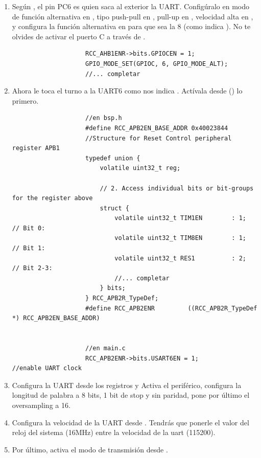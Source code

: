 \documentclass[../main.tex]{subfiles}
\begin{document}
        \begin{enumerate}
            \item Según \DSMAN[Table 10], el pin PC6 es quien saca al exterior la UART. Configúralo en modo de función alternativa en , tipo push-pull en , pull-up en , velocidad alta en , y configura la función alternativa en  para que sea la 8 (como indica \DSMAN[Table 12]). No te olvides de activar el puerto C a través de .
            
                \begin{lstlisting}
                    RCC_AHB1ENR->bits.GPIOCEN = 1;
                    GPIO_MODE_SET(GPIOC, 6, GPIO_MODE_ALT);
                    //... completar
                \end{lstlisting}

            \item Ahora le toca el turno a la UART6 como nos indica \BRDMAN[5.13]. Actívala desde  (\REFMAN[5.3.14]) lo primero.
            
                \begin{lstlisting}
                    //en bsp.h
                    #define RCC_APB2EN_BASE_ADDR 0x40023844
                    //Structure for Reset Control peripheral register APB1
                    typedef union {
                        volatile uint32_t reg;

                        // 2. Access individual bits or bit-groups for the register above
                        struct {
                            volatile uint32_t TIM1EN	   	: 1;  // Bit 0:
                            volatile uint32_t TIM8EN	   	: 1;  // Bit 1:
                            volatile uint32_t RES1		   	: 2;  // Bit 2-3:
                            //... completar
                        } bits;
                    } RCC_APB2R_TypeDef;
                    #define RCC_APB2ENR			((RCC_APB2R_TypeDef *) RCC_APB2EN_BASE_ADDR)

                    
                    //en main.c
                    RCC_APB2ENR->bits.USART6EN = 1; 		//enable UART clock
                \end{lstlisting}

            \item Configura la UART desde los registros  y  Activa el periférico, configura la longitud de palabra a 8 bits, 1 bit de stop y sin paridad, pone por último el oversampling a 16.
            \item Configura la velocidad de la UART desde . Tendrás que ponerle el valor del reloj del sistema (16MHz) entre la velocidad de la uart (115200).
            \item Por último, activa el modo de transmisión desde .
            

\end{enumerate}
\end{document}
